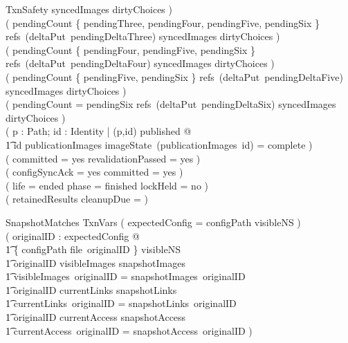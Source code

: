 \documentclass{article}
\begin{document}
\begin{schema}{TxnSafety}
	\dom syncedImages \cup \dom dirtyChoices ) \\
	( pendingCount \in \{ pendingThree, pendingFour, pendingFive, pendingSix \}
	\implies refs~(deltaPut~pendingDeltaThree) \subseteq
	\dom syncedImages \cup \dom dirtyChoices ) \\
	( pendingCount \in \{ pendingFour, pendingFive, pendingSix \} \implies
	refs~(deltaPut~pendingDeltaFour) \subseteq
	\dom syncedImages \cup \dom dirtyChoices ) \\
	( pendingCount \in \{ pendingFive, pendingSix \} \implies
	refs~(deltaPut~pendingDeltaFive) \subseteq
	\dom syncedImages \cup \dom dirtyChoices ) \\
	( pendingCount = pendingSix \implies
	refs~(deltaPut~pendingDeltaSix) \subseteq
	\dom syncedImages \cup \dom dirtyChoices ) \\
	( \forall p : Path; id : Identity | (p,id) \in published @ \\
	\t1 id \in \dom publicationImages \land
	imageState~(publicationImages~id) = complete ) \\
	( committed = yes \implies revalidationPassed = yes ) \\
	( configSyncAck = yes \implies committed = yes ) \\
	( life = ended \implies phase = finished \land lockHeld = no ) \\
	( \dom retainedResults \cap \dom cleanupDue = \emptyset )
\end{schema}

\begin{schema}{SnapshotMatches}
	TxnVars
	\where
	( expectedConfig = \emptyset \land configPath \notin \dom visibleNS ) \lor \\
	( \exists originalID : expectedConfig @ \\
	\t1 \{ configPath \mapsto file~originalID \} \subseteq visibleNS \land \\
	\t1 originalID \in \dom visibleImages \cap \dom snapshotImages \land \\
	\t1 visibleImages~originalID = snapshotImages~originalID \land \\
	\t1 originalID \in \dom currentLinks \cap \dom snapshotLinks \land \\
	\t1 currentLinks~originalID = snapshotLinks~originalID \land \\
	\t1 originalID \in \dom currentAccess \cap \dom snapshotAccess \land \\
	\t1 currentAccess~originalID = snapshotAccess~originalID )
\end{schema}
\end{document}
